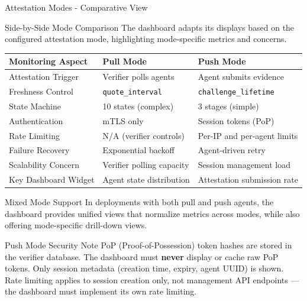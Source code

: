 \begin{frame}{Attestation Modes - Comparative View}
  \begin{block}{Side-by-Side Mode Comparison}
    \scriptsize
    The dashboard adapts its displays based on the configured attestation mode, highlighting
    mode-specific metrics and concerns.
  \end{block}

  \vspace{0.1cm}

  \scriptsize
  \begin{center}
    \begin{tabular}{|p{3cm}|p{3.5cm}|p{3.5cm}|}
      \hline
      \textbf{Monitoring Aspect} & \textbf{Pull Mode} & \textbf{Push Mode} \\
      \hline
      \hline
      Attestation Trigger & Verifier polls agents & Agent submits evidence \\
      \hline
      Freshness Control & \texttt{quote\_interval} & \texttt{challenge\_lifetime} \\
      \hline
      State Machine & 10 states (complex) & 3 stages (simple) \\
      \hline
      Authentication & mTLS only & Session tokens (PoP) \\
      \hline
      Rate Limiting & N/A (verifier controls) & Per-IP and per-agent limits \\
      \hline
      Failure Recovery & Exponential backoff & Agent-driven retry \\
      \hline
      Scalability Concern & Verifier polling capacity & Session management load \\
      \hline
      Key Dashboard Widget & Agent state distribution & Attestation submission rate \\
      \hline
    \end{tabular}
  \end{center}

  \vspace{0.2cm}

  \begin{exampleblock}{Mixed Mode Support}
    \scriptsize
    In deployments with both pull and push agents, the dashboard provides unified views
    that normalize metrics across modes, while also offering mode-specific drill-down views.
  \end{exampleblock}

  \begin{alertblock}{Push Mode Security Note}
    \scriptsize
    PoP (Proof-of-Possession) token hashes are stored in the verifier database. The dashboard
    must \textbf{never} display or cache raw PoP tokens. Only session metadata (creation time,
    expiry, agent UUID) is shown. Rate limiting applies to session creation only, not
    management API endpoints --- the dashboard must implement its own rate limiting.
  \end{alertblock}
\end{frame}
